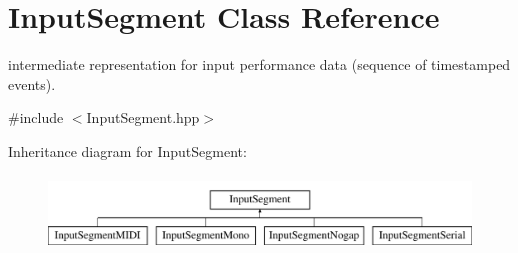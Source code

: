 \hypertarget{classInputSegment}{}\section{Input\+Segment Class Reference}
\label{classInputSegment}


intermediate representation for input performance data (sequence of timestamped events).  




{\ttfamily \#include $<$Input\+Segment.\+hpp$>$}

Inheritance diagram for Input\+Segment\+:\begin{figure}[H]
\begin{center}
\leavevmode
\includegraphics[height=2.000000cm]{classInputSegment}
\end{center}
\end{figure}
